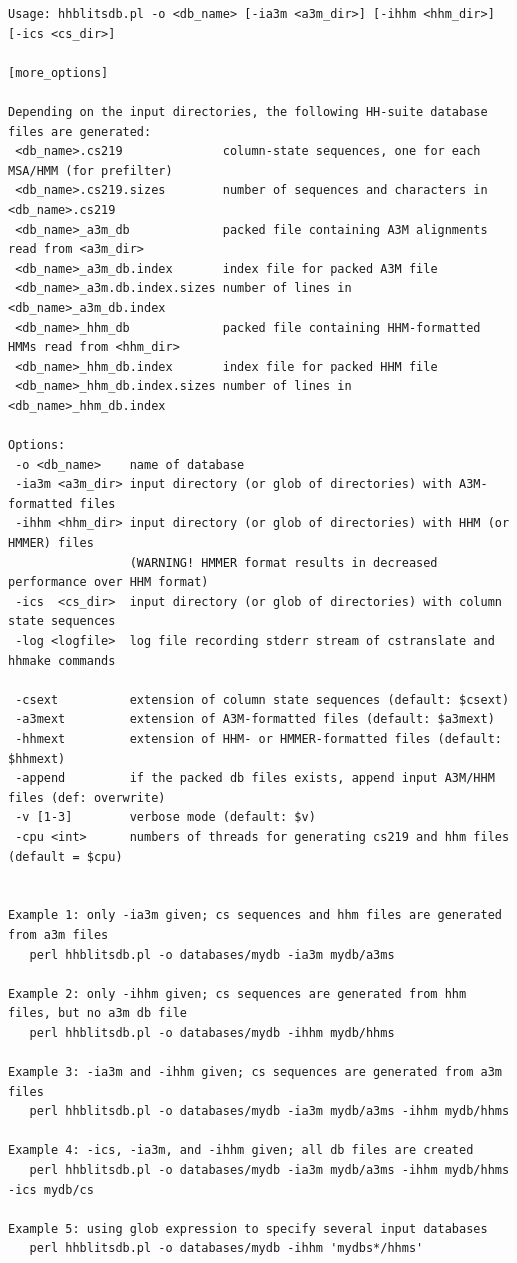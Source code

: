 \documentclass[11pt,a4paper]{article}
\begin{document}
\small 
\begin{verbatim}
Usage: hhblitsdb.pl -o <db_name> [-ia3m <a3m_dir>] [-ihhm <hhm_dir>] [-ics <cs_dir>] 
                                                                            [more_options]

Depending on the input directories, the following HH-suite database files are generated:
 <db_name>.cs219              column-state sequences, one for each MSA/HMM (for prefilter)
 <db_name>.cs219.sizes        number of sequences and characters in <db_name>.cs219
 <db_name>_a3m_db             packed file containing A3M alignments read from <a3m_dir>
 <db_name>_a3m_db.index       index file for packed A3M file
 <db_name>_a3m.db.index.sizes number of lines in <db_name>_a3m_db.index
 <db_name>_hhm_db             packed file containing HHM-formatted HMMs read from <hhm_dir>
 <db_name>_hhm_db.index       index file for packed HHM file
 <db_name>_hhm_db.index.sizes number of lines in <db_name>_hhm_db.index

Options:
 -o <db_name>    name of database
 -ia3m <a3m_dir> input directory (or glob of directories) with A3M-formatted files
 -ihhm <hhm_dir> input directory (or glob of directories) with HHM (or HMMER) files 
                 (WARNING! HMMER format results in decreased performance over HHM format)
 -ics  <cs_dir>  input directory (or glob of directories) with column state sequences
 -log <logfile>  log file recording stderr stream of cstranslate and hhmake commands

 -csext          extension of column state sequences (default: $csext)
 -a3mext         extension of A3M-formatted files (default: $a3mext)
 -hhmext         extension of HHM- or HMMER-formatted files (default: $hhmext)
 -append         if the packed db files exists, append input A3M/HHM files (def: overwrite)
 -v [1-3]        verbose mode (default: $v)
 -cpu <int>      numbers of threads for generating cs219 and hhm files (default = $cpu)

 
Example 1: only -ia3m given; cs sequences and hhm files are generated from a3m files
   perl hhblitsdb.pl -o databases/mydb -ia3m mydb/a3ms 

Example 2: only -ihhm given; cs sequences are generated from hhm files, but no a3m db file 
   perl hhblitsdb.pl -o databases/mydb -ihhm mydb/hhms 

Example 3: -ia3m and -ihhm given; cs sequences are generated from a3m files
   perl hhblitsdb.pl -o databases/mydb -ia3m mydb/a3ms -ihhm mydb/hhms   

Example 4: -ics, -ia3m, and -ihhm given; all db files are created 
   perl hhblitsdb.pl -o databases/mydb -ia3m mydb/a3ms -ihhm mydb/hhms -ics mydb/cs  

Example 5: using glob expression to specify several input databases
   perl hhblitsdb.pl -o databases/mydb -ihhm 'mydbs*/hhms'  
\end{verbatim} 
\normalsize
\end{document}
